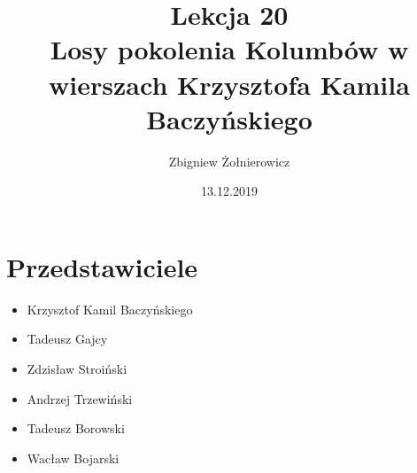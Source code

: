 \documentclass[a4paper]{article}
\begin{document}
\title{{\huge Lekcja 20} \\
{\large Losy pokolenia Kolumbów w wierszach Krzysztofa Kamila Baczyńskiego}}
\author{Zbigniew Żołnierowicz}
\date{13.12.2019}
\maketitle
\section{Przedstawiciele}
\begin{itemize}
    \item Krzysztof Kamil Baczyńskiego
    \item Tadeusz Gajcy
    \item Zdzisław Stroiński
    \item Andrzej Trzewiński
    \item Tadeusz Borowski
    \item Wacław Bojarski
\end{itemize}
\end{document}
